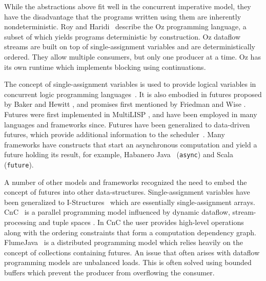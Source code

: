 While the abstractions above fit well in the concurrent imperative
model, they have the disadvantage that the programs written using them
are inherently nondeterministic.
Roy and Haridi~\cite{RoyH2004} describe the Oz programming language,
a subset of which yields programs deterministic by construction.
Oz dataflow streams are built on top of
single-assignment variables and are deterministically ordered.
They allow multiple consumers, but only one producer
at a time.
Oz has its own runtime which implements blocking using
continuations.

The concept of single-assignment variables is used to provide logical
variables in concurrent logic programming languages~\cite{Shapiro89}.
It is also embodied in
futures proposed by Baker and Hewitt \cite{Hewitt77}, and promises
first mentioned by Friedman and Wise \cite{Wise76}.
Futures were first implemented in MultiLISP \cite{Halstead85},
and have been employed in many languages and frameworks since.
Futures have been generalized to data-driven futures,
which provide additional information to the scheduler~\cite{Tasirlar11}.
Many frameworks have constructs that start an asynchronous
computation and yield a future holding its result, for example, Habanero Java~\cite{Shirako11} (\verb=async=)
and Scala~\cite{Odersky10} (\verb=future=).


A number of other models and frameworks recognized the need to embed
the concept of futures into other data-structures.
Single-assignment variables have been generalized to I-Structures~\cite{Arvind89} which are essentially
single-assignment arrays.
CnC~\cite{Burke11,CnC10} is a parallel programming model
influenced by dynamic dataflow, stream-processing and tuple spaces \cite{Gelernter85}.
In CnC the user provides high-level operations along with the ordering
constraints that form a computation dependency graph.
FlumeJava~\cite{Chambers10} is a distributed programming model which
relies heavily on the concept of collections containing futures.
An issue that often arises with dataflow programming models are
unbalanced loads.
This is often solved using bounded buffers which prevent
the producer from overflowing the consumer.

